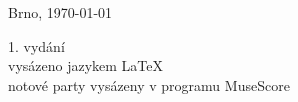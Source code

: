 \vspace*{\fill}
\begin{otherlanguage}{czech}
Brno, \today\\
\end{otherlanguage}
1. vydání\\
vysázeno jazykem \LaTeX\\
notové party vysázeny v programu MuseScore
\vspace*{50pt}
\newpage